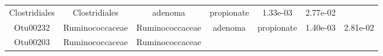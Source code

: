 \documentclass[11pt,]{article}
\begin{document}
\begin{longtable}[]{@{}ccccccc@{}}
\begin{minipage}[t]{0.17\columnwidth}
Clostridiales\strut
\end{minipage} & \begin{minipage}[t]{0.17\columnwidth}\centering\strut
Clostridiales\strut
\end{minipage} & \begin{minipage}[t]{0.09\columnwidth}\centering\strut
adenoma\strut
\end{minipage} & \begin{minipage}[t]{0.11\columnwidth}\centering\strut
propionate\strut
\end{minipage} & \begin{minipage}[t]{0.09\columnwidth}\centering\strut
1.33e-03\strut
\end{minipage} & \begin{minipage}[t]{0.09\columnwidth}\centering\strut
2.77e-02\strut
\end{minipage}\tabularnewline
\begin{minipage}[t]{0.09\columnwidth}\centering\strut
Otu00232\strut
\end{minipage} & \begin{minipage}[t]{0.17\columnwidth}\centering\strut
Ruminococcaceae\strut
\end{minipage} & \begin{minipage}[t]{0.17\columnwidth}\centering\strut
Ruminococcaceae\strut
\end{minipage} & \begin{minipage}[t]{0.09\columnwidth}\centering\strut
adenoma\strut
\end{minipage} & \begin{minipage}[t]{0.11\columnwidth}\centering\strut
propionate\strut
\end{minipage} & \begin{minipage}[t]{0.09\columnwidth}\centering\strut
1.40e-03\strut
\end{minipage} & \begin{minipage}[t]{0.09\columnwidth}\centering\strut
2.81e-02\strut
\end{minipage}\tabularnewline
\begin{minipage}[t]{0.09\columnwidth}\centering\strut
Otu00203\strut
\end{minipage} & \begin{minipage}[t]{0.17\columnwidth}\centering\strut
Ruminococcaceae\strut
\end{minipage} & \begin{minipage}[t]{0.17\columnwidth}\centering\strut
Ruminococcaceae\strut
\end{minipage} & \begin{minipage}[t]{0.09\columnwidth}\centering\strut

\end{minipage}
\end{longtable}
\end{document}
